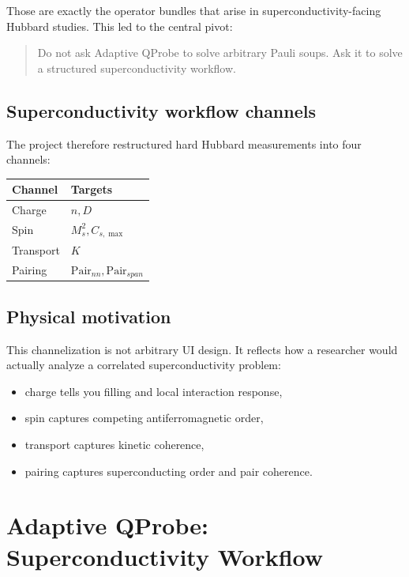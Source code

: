 \documentclass[11pt]{article}
\begin{document}
Those are exactly the operator bundles that arise in superconductivity-facing Hubbard studies. This led to the central pivot:

\begin{quote}
Do not ask Adaptive QProbe to solve arbitrary Pauli soups. Ask it to solve a structured superconductivity workflow.
\end{quote}

\subsection{Superconductivity workflow channels}

The project therefore restructured hard Hubbard measurements into four channels:

\begin{center}
\begin{tabular}{ll}
\toprule
Channel & Targets \\
\midrule
Charge & \(n, D\) \\
Spin & \(M_s^2, C_{s,\max}\) \\
Transport & \(K\) \\
Pairing & \(\mathrm{Pair}_{nn}, \mathrm{Pair}_{span}\) \\
\bottomrule
\end{tabular}
\end{center}

\subsection{Physical motivation}

This channelization is not arbitrary UI design. It reflects how a researcher would actually analyze a correlated superconductivity problem:

\begin{itemize}
\item charge tells you filling and local interaction response,
\item spin captures competing antiferromagnetic order,
\item transport captures kinetic coherence,
\item pairing captures superconducting order and pair coherence.
\end{itemize}

\section{Adaptive QProbe: Superconductivity Workflow}
\end{document}
